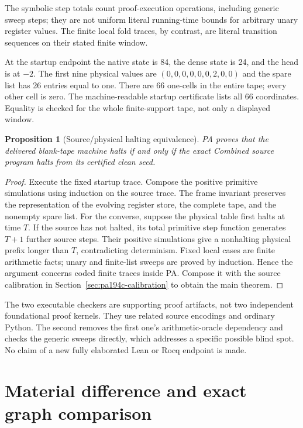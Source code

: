 \documentclass[11pt,letterpaper]{article}
\newtheorem{proposition}[theorem]{Proposition}
\begin{document}
The symbolic step totals count proof-execution operations, including
generic sweep steps; they are not uniform literal running-time bounds for
arbitrary unary register values. The finite local fold traces, by contrast,
are literal transition sequences on their stated finite window.

At the startup endpoint the native state is 84, the dense state is 24,
and the head is at $-2$. The first nine physical values are
$(0,0,0,0,0,0,2,0,0)$ and the spare list has 26 entries equal to one.
There are 66 one-cells in the entire tape; every other cell is zero.
The machine-readable startup certificate lists all 66 coordinates. Equality
is checked for the whole finite-support tape, not only a displayed window.

\begin{proposition}[Source/physical halting equivalence]
PA proves that the delivered blank-tape machine halts if and only if the
exact Combined source program halts from its certified clean seed.
\end{proposition}
\begin{proof}
Execute the fixed startup trace. Compose the positive primitive simulations
using induction on the source trace. The frame invariant preserves the representation
of the evolving register store, the complete tape, and the nonempty spare list.
For the converse, suppose the physical table first halts at time $T$.
If the source has not halted, its total primitive step function generates
$T+1$ further source steps. Their positive simulations give a nonhalting
physical prefix longer than $T$, contradicting determinism. Fixed local
cases are finite arithmetic facts; unary and finite-list sweeps are proved
by induction. Hence the argument concerns coded finite traces inside PA.
Compose it with the source calibration in
Section~\ref{sec:pa194c-calibration} to obtain the main theorem.
\end{proof}

The two executable checkers are supporting proof artifacts, not two
independent foundational proof kernels. They use related source encodings
and ordinary Python. The second removes the first one's arithmetic-oracle
dependency and checks the generic sweeps directly, which addresses a
specific possible blind spot. No claim of a new fully elaborated Lean or
Rocq endpoint is made.

\section{Material difference and exact graph comparison}
\label{sec:novelty}
\end{document}
